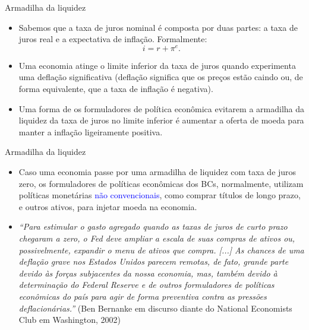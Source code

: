 \documentclass[10pt]{beamer}
\begin{document}
\begin{frame}{Armadilha da liquidez}
\begin{itemize}
    \item Sabemos que a taxa de juros nominal é composta por duas partes: a taxa de juros real e a expectativa de inflação. Formalmente:
    \begin{equation}
        i = r + \pi^e.
        \label{eq4}
    \end{equation}
    \bigskip
    \item Uma economia atinge o limite inferior da taxa de juros quando experimenta uma deflação significativa (deflação significa que os preços estão caindo ou, de forma equivalente, que a taxa de inflação é negativa).
    \bigskip
    \item Uma forma de os formuladores de política econômica evitarem a armadilha da liquidez da taxa de juros no limite inferior é aumentar a oferta de moeda para manter a inflação ligeiramente positiva.
\end{itemize}
\end{frame}

\begin{frame}{Armadilha da liquidez}
\begin{itemize}
    \item Caso uma economia passe por uma armadilha de liquidez com taxa de juros zero, os formuladores de políticas econômicas dos BCs, normalmente, utilizam políticas monetárias \textcolor{blue}{não convencionais}, como comprar títulos de longo prazo, e outros ativos, para injetar moeda na economia.
    \bigskip
    \item \emph{``Para estimular o gasto agregado quando as taxas de juros de curto prazo chegaram a zero, o Fed deve ampliar a escala de suas compras de ativos ou, possivelmente, expandir o menu de ativos que compra. [...] As chances de uma deflação grave nos Estados Unidos parecem remotas, de fato, grande parte devido às forças subjacentes da nossa economia, mas, também devido à determinação do Federal Reserve e de outros formuladores de políticas econômicas do país para agir de forma preventiva contra as pressões deflacionárias.''} (Ben Bernanke em discurso diante do National Economists Club em Washington, 2002)
\end{itemize}
\end{frame}
\end{document}
